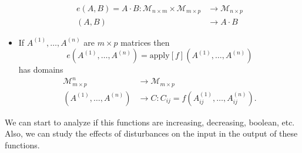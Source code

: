 \begin{itemize}
		\begin{align*}
			e(A, B)=A\cdot B:\mathcal{M}_{n\times m}\times\mathcal{M}_{m\times p}&\rightarrow \mathcal{M}_{n\times p} \\
			(A, B)&\rightarrow A\cdot B
		\end{align*}
	\item If $A^{(1)}, \ldots, A^{(n)}$ are $m\times p$ matrices then $$e(A^{(1)}, \ldots, A^{(n)})=\text{apply}[f](A^{(1)}, \ldots, A^{(n)})$$ has domains
		\begin{align*}
			\mathcal{M}_{m\times p}^n&\rightarrow \mathcal{M}_{m\times p} \\
			(A^{(1)}, \ldots, A^{(n)})&\rightarrow C:C_{ij}=f(A^{(1)}_{ij}, \ldots, A^{(n)}_{ij}).
		\end{align*}
\end{itemize}

We can start to analyze if this functions are increasing, decreasing, boolean, etc. Also, we can study the effects of disturbances on the input in the output of these functions.